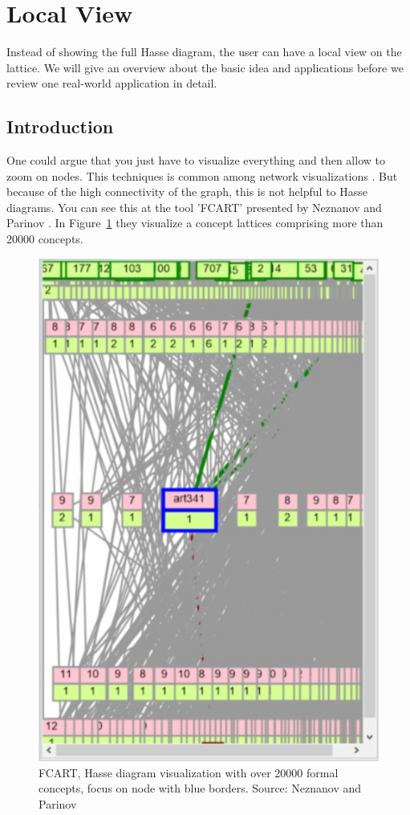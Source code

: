 \documentclass[11pt]{report}
\begin{document}
\section{Local View}
\label{Local View}

Instead of showing the full Hasse diagram, the user can have a local view on the lattice. We will give an overview about the basic idea and applications before we review one real-world application in detail. \\

\subsection{Introduction}

One could argue that you just have to visualize everything and then allow to zoom on nodes. This techniques is common among network visualizations \cite{Herman2000}. But because of the high connectivity of the graph, this is not helpful to Hasse diagrams. You can see this at the tool 'FCART' presented by Neznanov and Parinov \cite{Neznanov2014}. In Figure~\ref{figure:fcart} they visualize a concept lattices comprising more than 20000 concepts. \\

\begin{figure}[!ht]
	\centering
	\includegraphics[width=0.5\linewidth]{./images/fcart}
\caption{FCART, Hasse diagram visualization with over 20000 formal concepts, focus on node with blue borders. Source: Neznanov and Parinov \cite{Neznanov2014}}
\label{figure:fcart}
\end{figure}
\end{document}
